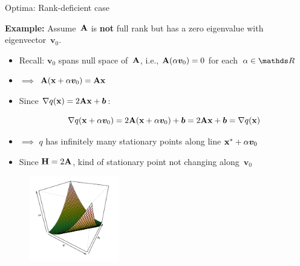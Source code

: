 \documentclass[11pt,compress,t,notes=noshow, xcolor=table]{beamer}
\begin{document}
\begin{vbframe}{Optima: Rank-deficient case}

\footnotesize

\textbf{Example:} Assume~$\mathbf{A}$ is \textbf{not} full rank but has a zero eigenvalue with eigenvector~$\bm{v}_0$.

\begin{itemize}
    \item Recall: $\bm{v}_0$ spans null space of~$\mathbf{A}$, i.e., $\mathbf{A}(\alpha\bm{v}_0) = 0$ for each~$\alpha\in\R$
    \item $\implies$ $\mathbf{A}(\mathbf{x} + \alpha\bm{v}_0) = \mathbf{A}\mathbf{x}$
    \item Since $\nabla q(\mathbf{x}) = 2\mathbf{A}\mathbf{x} + \bm{b}$:
        
        \vspace{-0.5\baselineskip}
        
        \begin{equation*}
            \nabla q(\mathbf{x}+\alpha\bm{v}_0) = 2\mathbf{A}(\mathbf{x}+\alpha\bm{v}_0)+\bm{b} = 2\mathbf{A}\mathbf{x}+\bm{b} = \nabla q(\mathbf{x})
        \end{equation*}
    \item $\implies$ $q$ has infinitely many stationary points along line $\mathbf{x}^\ast+\alpha\bm{v}_0$
    \item Since $\mathbf{H} = 2\mathbf{A}$, kind of stationary point not changing along~$\bm{v}_0$
\end{itemize}

\begin{figure}
    \centering
    \includegraphics[width=0.35\textwidth]{figure_man/convex-example.png}
\end{figure}

\end{vbframe}

\endlecture
\end{document}

